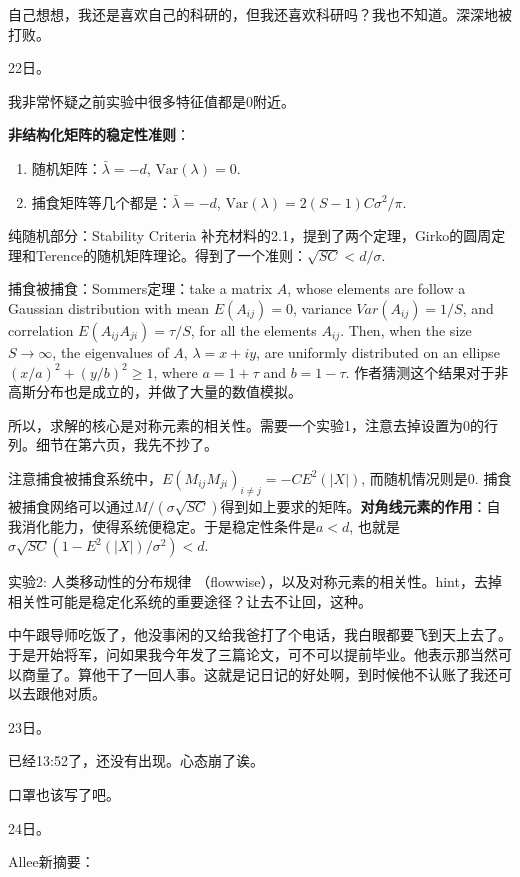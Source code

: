 自己想想，我还是喜欢自己的科研的，但我还喜欢科研吗？我也不知道。深深地被打败。

22日。

我非常怀疑之前实验中很多特征值都是0附近。

\textbf{非结构化矩阵的稳定性准则}：\begin{enumerate}
    \item 随机矩阵：$\bar{\lambda} = -d$, $\text{Var}(\lambda) = 0$.
    \item 捕食矩阵等几个都是：$\bar{\lambda} = -d$, $\text{Var}(\lambda) = 2(S-1)C\sigma^2/\pi$. 
\end{enumerate}

纯随机部分：Stability Criteria 补充材料的2.1，提到了两个定理，Girko的圆周定理和Terence的随机矩阵理论。得到了一个准则：$\sqrt{SC} < d / \sigma$.

捕食被捕食：Sommers定理：take a matrix $A$, whose elements are follow a Gaussian distribution with mean $E(A_{ij}) = 0$, variance $Var(A_{ij}) = 1/S$, and correlation $E(A_{ij}A_{ji}) = \tau/S$, for all the elements $A_{ij}$. Then, when the size $S \to \infty$, the eigenvalues of $A$, $\lambda = x + iy$, are uniformly distributed on an ellipse $(x/a)^{2} + (y/b)^{2} \geq 1$, where $a = 1 + \tau$ and $b = 1 − \tau$. 作者猜测这个结果对于非高斯分布也是成立的，并做了大量的数值模拟。

所以，求解的核心是对称元素的相关性。需要一个实验1，注意去掉设置为0的行列。细节在第六页，我先不抄了。

注意捕食被捕食系统中，$E(M_{ij}M_{ji})_{i \ne j} = -CE^{2}(|X|)$, 而随机情况则是$0$. 捕食被捕食网络可以通过$M/(\sigma \sqrt{SC})$得到如上要求的矩阵。\textbf{对角线元素的作用}：自我消化能力，使得系统便稳定。于是稳定性条件是$a < d$, 也就是 $\sigma\sqrt{SC}(1-E^{2}(|X|)/\sigma^{2}) < d$.

实验2: 人类移动性的分布规律 （flowwise），以及对称元素的相关性。hint，去掉相关性可能是稳定化系统的重要途径？让去不让回，这种。

\dotfill

中午跟导师吃饭了，他没事闲的又给我爸打了个电话，我白眼都要飞到天上去了。于是开始将军，问如果我今年发了三篇论文，可不可以提前毕业。他表示那当然可以商量了。算他干了一回人事。这就是记日记的好处啊，到时候他不认账了我还可以去跟他对质。


23日。

已经13:52了，还没有出现。心态崩了诶。

口罩也该写了吧。

24日。

Allee新摘要：

